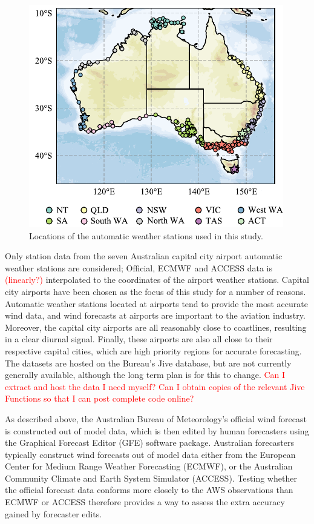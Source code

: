 \documentclass[alpha-refs]{wiley-article}
\begin{document}
\begin{figure}
\centering
\includegraphics{map.pdf}
\caption{Locations of the automatic weather stations used in this study.}
\label{Fig:station_map}
\end{figure}

Only station data from the seven Australian capital city airport automatic weather stations are considered; Official, ECMWF and ACCESS  data is \textcolor{red}{(linearly?)} interpolated to the coordinates of the airport weather stations. Capital city airports have been chosen as the focus of this study for a number of reasons. Automatic weather stations located at airports tend to provide the most accurate wind data, and wind forecasts at airports are important to the aviation industry. Moreover, the capital city airports are all reasonably close to coastlines, resulting in a clear diurnal signal. Finally, these airports are also all close to their respective capital cities, which are high priority regions for accurate forecasting. The datasets are hosted on the Bureau's Jive database, but are not currently generally available, although the long term plan is for this to change. \textcolor{red}{Can I extract and host the data I need myself? Can I obtain copies of the relevant Jive Functions so that I can post complete code online?}

As described above, the Australian Bureau of Meteorology's official wind forecast is constructed out of model data, which is then edited by human forecasters using the Graphical Forecast Editor (GFE) software package. Australian forecasters typically construct wind forecasts out of model data either from the European Center for Medium Range Weather Forecasting (ECMWF), or the Australian Community Climate and Earth System Simulator (ACCESS). Testing whether the official forecast data conforms more closely to the AWS observations than ECMWF or ACCESS therefore provides a way to assess the extra accuracy gained by forecaster edits.
\end{document}
